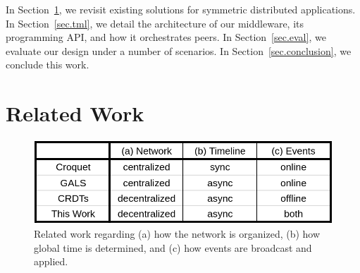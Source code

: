 \documentclass[10pt,journal,compsoc]{IEEEtran}
\begin{document}
In Section~\ref{sec.related}, we revisit existing solutions for symmetric
distributed applications.
In Section~\ref{sec.tml}, we detail the architecture of our middleware, its
programming API, and how it orchestrates peers.
In Section~\ref{sec.eval}, we evaluate our design under a number of scenarios.
In Section~\ref{sec.conclusion}, we conclude this work.

\section{Related Work}
\label{sec.related}

\begin{figure}
  \centering
  \includegraphics[width=\linewidth]{table}
  \caption{
    Related work regarding
        (a) how the network is organized,
        (b) how global time is determined, and
        (c) how events are broadcast and applied.
    \label{fig.table}
  }
\end{figure}
\end{document}
